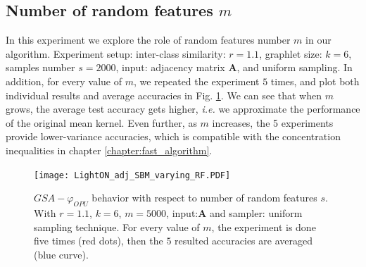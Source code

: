 \subsection{Number of random features $m$}
In this experiment we explore the role of random features number $m$ in our algorithm. 
Experiment setup: inter-class similarity: $r=1.1$, graphlet size: $k=6$, samples number $s=2000$, input: adjacency matrix $\mathbf{A}$, and uniform sampling.
In addition, for every value of $m$, we repeated the experiment $5$ times, and plot both individual results and average accuracies in Fig. \ref{fig:varying_random_features}. We can see that when $m$ grows, the average test accuracy gets higher, \emph{i.e.} we approximate the performance of the original mean kernel. Even further, as $m$ increases, the 5 experiments provide lower-variance accuracies, which is compatible with the concentration inequalities in chapter \ref{chapter:fast_algorithm}.

\begin{figure}[H]
\centering
\texttt{[image: LightON\_adj\_SBM\_varying\_RF.PDF]}
\caption[$GSA-\varphi_{OPU}$ behavior with respect to number of random features $m$]{$GSA-\varphi_{OPU}$ behavior with respect to number of random features $s$. With  $r=1.1$, $k=6$, $m=5000$, input:$\mathbf{A}$ and sampler: uniform sampling technique. For every value of $m$, the experiment is done five times (red dots), then the $5$ resulted accuracies are averaged (blue curve).}
\label{fig:varying_random_features}
\end{figure}

